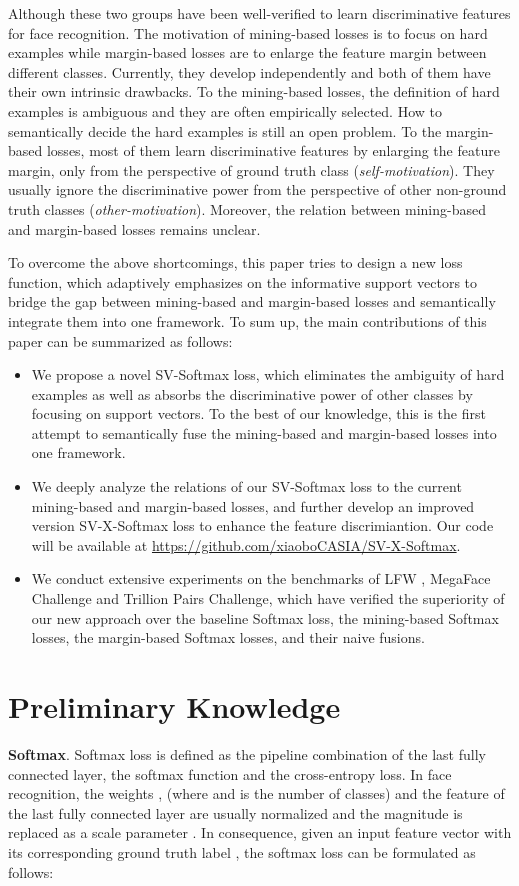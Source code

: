 \documentclass[10pt,twocolumn,letterpaper]{article}
\begin{document}
Although these two groups have been well-verified to learn discriminative features for face recognition. The motivation of mining-based losses is to focus on hard examples while margin-based losses are to enlarge the feature margin between different classes. Currently, they develop independently and both of them have their own intrinsic drawbacks. To the mining-based losses, the definition of hard examples is ambiguous and they are often empirically selected. How to semantically decide the hard examples is still an open problem. To the margin-based losses, most of them learn discriminative features by enlarging the feature margin, only from the perspective of ground truth class (\textit{self-motivation}). They usually ignore the discriminative power from the perspective of other non-ground truth classes (\textit{other-motivation}). Moreover, the relation between mining-based and margin-based losses remains unclear.

To overcome the above shortcomings, this paper tries to design a new loss function, which adaptively emphasizes on the informative support vectors to bridge the gap between mining-based and margin-based losses and semantically integrate them into one framework. To sum up, the main contributions of this paper can be summarized as follows:
\begin{itemize}
\item{We propose a novel SV-Softmax loss, which eliminates the ambiguity of hard examples as well as absorbs the discriminative power of other classes by focusing on support vectors. To the best of our knowledge, this is the first attempt to semantically fuse the mining-based and margin-based losses into one framework.}
\item{We deeply analyze the relations of our SV-Softmax loss to the current mining-based and margin-based losses, and further develop an
improved version SV-X-Softmax loss to enhance the feature discrimiantion. Our code will be available at {\url{https://github.com/xiaoboCASIA/SV-X-Softmax}}.}
\item{We conduct extensive experiments on the benchmarks of LFW \cite{LFW}, MegaFace Challenge \cite{megaface_1,megaface_2} and Trillion Pairs Challenge, which have verified the superiority of our new approach over the baseline Softmax loss, the mining-based Softmax losses, the margin-based Softmax losses, and their naive fusions.}
\end{itemize}

\section{Preliminary Knowledge}
\noindent \textbf{Softmax}. Softmax loss is defined as the pipeline combination of the last fully connected layer, the softmax function and the cross-entropy loss. In face recognition, the weights , (where  and  is the number of classes) and the feature  of the last fully connected layer are usually normalized and the magnitude is replaced as a scale parameter  \cite{NormFace,AM-Softmax,Arc-Softmax}. In consequence, given an input feature vector  with its corresponding ground truth label , the softmax loss can be formulated as follows:
\end{document}
